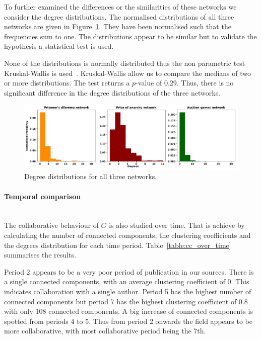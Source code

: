 \documentclass{article}
\begin{document}
To further examined the differences or the similarities of these networks we
consider the degree distributions. The normalised distributions of all
three networks are given in Figure~\ref{fig:degrees_dist}. They have been normalised
such that the frequencies sum to one. The distributions appear to be similar
but to validate the hypothesis a statistical test is used.

None of the distributions is normally distributed thus the non parametric test
Kruskal-Wallis is used~\cite{mckight2010}. Kruskal-Wallis allow us to compare the
medians of two or more distributions. The test returns a \(p\)-value of 0.29.
Thus, there is no significant difference in the degree distributions of the
three networks.

\begin{figure}[!hbtp]
    \centering
    \includegraphics[width=\textwidth]{./assets/images/degrees_histrograms.pdf}
    \caption{Degree distributions for all three networks.}\label{fig:degrees_dist}
\end{figure}

\paragraph{Temporal comparison}
\mbox{ }\\

The collaborative behaviour of \(G\) is also studied over time. That is achieve
by calculating the number of connected components, the clustering coefficients and
the degrees distribution for each time period. Table~\ref{table:cc_over_time}
summarises the results.

Period 2 appears to be a very poor period of publication in our sources. There is
a single connected components, with an average clustering coefficient of 0. This
indicates collaboration with a single author.
Period 5 has the highest number of connected components but period 7 has the highest
clustering coefficient of 0.8 with only 108 connected components.
A big increase of connected components is spotted from periods 4 to 5.
Thus from period 2 onwards the field appears to be more collaborative, with most
collaborative period being the 7th.
\end{document}

